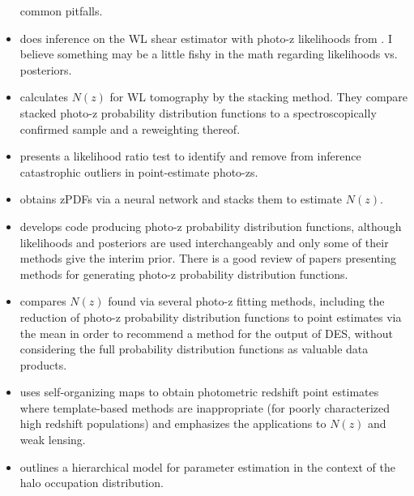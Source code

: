 \documentclass[preprint]{aastex}
\begin{document}
\begin{itemize}
common pitfalls.
\item \citet{app12} does inference on the WL shear estimator with photo-z 
likelihoods from \citet{kel12}.  I believe something may be a little fishy in 
the math regarding likelihoods vs. posteriors.
\item \citet{ben12} calculates $N(z)$ for WL tomography by the stacking method. 
 They compare stacked photo-z probability distribution functions to a 
spectroscopically confirmed sample and a reweighting thereof.
\item \citet{gor13} presents a likelihood ratio test to identify and remove 
from inference catastrophic outliers in point-estimate photo-zs.
\item \citet{bon13} obtains zPDFs via a neural network and stacks them to 
estimate $N(z)$.
\item \citet{sad15} develops code producing photo-z probability distribution 
functions, although likelihoods and posteriors are used interchangeably and 
only some of their methods give the interim prior.  There is a good review of 
papers presenting methods for generating photo-z probability distribution 
functions.
\item \citet{bon15} compares $N(z)$ found via several photo-z fitting methods, 
including the reduction of photo-z probability distribution functions to point 
estimates via the mean in order to recommend a method for the output of DES, 
without considering the full probability distribution functions as valuable 
data products.
\item \citet{mas15} uses self-organizing maps to obtain photometric redshift 
point estimates where template-based methods are inappropriate (for poorly 
characterized high redshift populations) and emphasizes the applications to 
$N(z)$ and weak lensing.
\item \citet{mar15} outlines a hierarchical model for parameter estimation in 
the context of the halo occupation distribution.
\end{itemize}
\end{document}
